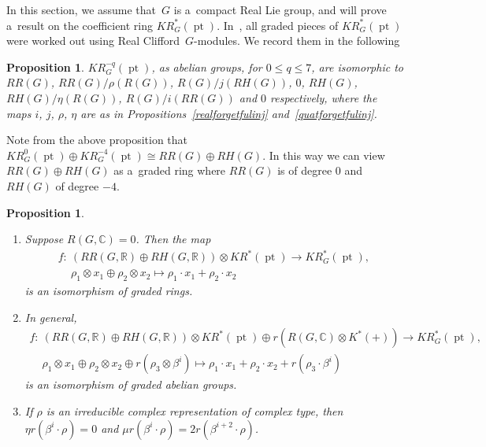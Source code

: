 \documentclass[pdftex]{sigma}
\numberwithin{equation}{section}
\newtheorem{Proposition}[Theorem]{Proposition}
{\theoremstyle{definition}
\newtheorem{Definition}[Theorem]{Definition}
\newtheorem{Example}[Theorem]{Example}
\newtheorem{Remark}[Theorem]{Remark}
}
\DeclareMathOperator{\pt}{pt}
\begin{document}
In this section, we assume that~$G$ is a~compact Real Lie group, and will prove a~result on the coef\/f\/icient ring
$KR_G^*(\pt)$.
In~\cite{AS}, all graded pieces of $KR_G^*(\pt)$ were worked out using Real Clif\/ford~$G$-modules.
We record them in the following
\begin{Proposition}
\label{ASKRcomp}
$KR^{-q}_G(\pt)$, as abelian groups, for $0\leq q\leq 7$, are isomorphic to $RR(G)$, $RR(G)/\rho(R(G))$,
$R(G)/j(RH(G))$, $0$, $RH(G)$, $RH(G)/\eta(R(G))$, $R(G)/i(RR(G))$ and $0$ respectively, where the maps $i$, $j$, $\rho$, $\eta$
are as in Propositions~{\rm \ref{realforgetfulinj}} and~{\rm \ref{quatforgetfulinj}}.
\end{Proposition}
\begin{Remark}
Note from the above proposition
that $KR_G^0(\pt)\oplus KR^{-4}_G(\pt)\cong RR(G)\oplus RH(G)$.
In this way we can view $RR(G)\oplus RH(G)$ as a~graded ring where $RR(G)$ is of degree 0 and $RH(G)$ of degree $-4$.
\end{Remark}
\begin{Proposition}\label{KR_G}\quad
\begin{enumerate}\itemsep=0pt
\item[$1.$]
Suppose $R(G, \mathbb{C})=0$.
Then the map
\begin{gather*}
f:  \ (RR(G, \mathbb{R})\oplus RH(G, \mathbb{R}))\otimes KR^*(\pt)  \to  KR^*_G(\pt),
\\
\phantom{f: {}} \
\rho_1\otimes x_1\oplus \rho_2\otimes x_2  \mapsto  \rho_1\cdot x_1+\rho_2\cdot x_2
\end{gather*}
is an isomorphism of graded rings.
\item[$2.$]
In general,
\begin{gather*}
f: \ (RR(G, \mathbb{R})\oplus RH(G, \mathbb{R}))\otimes KR^*(\pt)\oplus r(R(G, \mathbb{C})\otimes K^*(+))\to
KR^*_G(\pt),
\\
\phantom{f: {}} \
\rho_1\otimes x_1\oplus \rho_2\otimes x_2\oplus r(\rho_3\otimes \beta^i)\mapsto \rho_1\cdot x_1+\rho_2\cdot
x_2+r(\rho_3\cdot\beta^i)
\end{gather*}
is an isomorphism of graded abelian groups.
\item[$3.$]
If $\rho$ is an irreducible complex representation of complex type, then $\eta r(\beta^i\cdot\rho)=0$ and $\mu
r(\beta^i\cdot\rho)=2r(\beta^{i+2}\cdot\rho)$.
\end{enumerate}
\end{Proposition}
\end{document}
